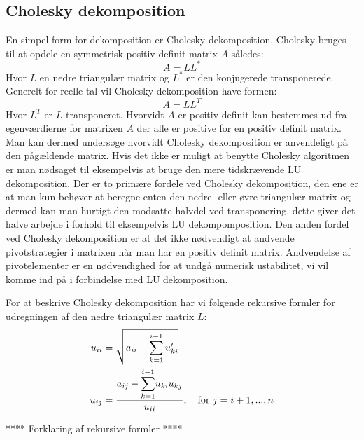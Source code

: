 \documentclass{article}
\begin{document}
\subsection{Cholesky dekomposition}
En simpel form for dekomposition er Cholesky dekomposition.
Cholesky bruges til at opdele en symmetrisk positiv definit matrix $A$ således:
$$A = LL^*$$
Hvor $L$ en nedre triangulær matrix og $L^*$ er den konjugerede transponerede.\vspace{\baselineskip}
Generelt for reelle tal vil Cholesky dekomposition have formen:
$$A = LL^T$$
Hvor $L^T$ er $L$ transponeret.\vspace{\baselineskip}
Hvorvidt $A$ er positiv definit kan bestemmes ud fra egenværdierne for matrixen $A$ der alle er positive for en positiv definit matrix. Man kan dermed undersøge hvorvidt Cholesky dekomposition er anvendeligt på den pågældende matrix. Hvis det ikke er muligt at benytte Cholesky algoritmen er man nødsaget til eksempelvis at bruge den mere tidskrævende LU dekomposition.
Der er to primære fordele ved Cholesky dekomposition, den ene er at man kun behøver at beregne enten den nedre- eller øvre triangulær matrix og dermed kan man hurtigt den modsatte halvdel ved transponering, dette giver det halve arbejde i forhold til eksempelvis LU dekompomposition. Den anden fordel ved Cholesky dekomposition er at det ikke nødvendigt at andvende pivotstrategier i matrixen når man har en positiv definit matrix. Andvendelse af pivotelementer er en nødvendighed for at undgå numerisk ustabilitet, vi vil komme ind på i forbindelse med LU dekomposition. \newline

For at beskrive Cholesky dekomposition har vi følgende rekursive formler for udregningen af den nedre triangulær matrix $L$: 
\begin{align*}
u_{ii} &= \sqrt{a_{ii} - \sum\limits_{k=1}^{i-1} u_{ki}'}\\
u_{ij} &= \frac{a_{ij} - \mathlarger{\sum\limits_{k=1}^{i-1}} u_{ki}u_{kj}}{u_{ii}} , \ \ \ \text{for } j=i + 1, ..., n
\end{align*}

****
Forklaring af rekursive formler
****
\end{document}
